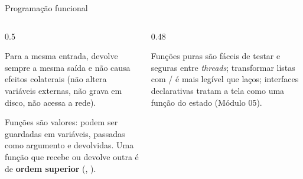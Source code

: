 \begin{frame}{Programação funcional}
  \begin{columns}[T]
    \begin{column}{0.5\textwidth}
      \begin{definicao}
        Para a mesma entrada, devolve sempre a mesma saída e não causa efeitos colaterais (não altera variáveis externas, não grava em disco, não acessa a rede).
      \end{definicao}
      \begin{definicao}
        Funções são valores: podem ser guardadas em variáveis, passadas como argumento e devolvidas. Uma função que recebe ou devolve outra é de \textbf{ordem superior} (, ).
      \end{definicao}
    \end{column}
    \begin{column}{0.48\textwidth}
      \centering
      \begin{conceito}
        Funções puras são fáceis de testar e seguras entre \emph{threads}; transformar listas com / é mais legível que laços; interfaces declarativas tratam a tela como uma função do estado (Módulo 05).
      \end{conceito}
    \end{column}
  \end{columns}
\end{frame}


